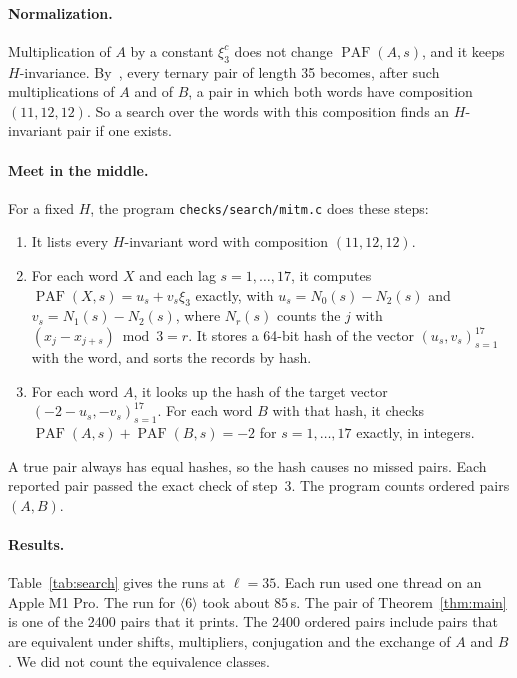 \documentclass[11pt]{article}
\theoremstyle{remark}
\newcommand{\PAF}{\operatorname{PAF}}
\begin{document}
\paragraph{Normalization.} Multiplication of $A$ by a constant $\xi_3^c$ does not change $\PAF(A, s)$, and it keeps $H$-invariance. By~\cite[Theorem~4]{KLW}, every ternary pair of length 35 becomes, after such multiplications of $A$ and of $B$, a pair in which both words have composition $(11, 12, 12)$. So a search over the words with this composition finds an $H$-invariant pair if one exists.

\paragraph{Meet in the middle.} For a fixed $H$, the program \texttt{checks/search/mitm.c} does these steps:
\begin{enumerate}
  \item It lists every $H$-invariant word with composition $(11, 12, 12)$.
  \item For each word $X$ and each lag $s = 1, \dots, 17$, it computes $\PAF(X, s) = u_s + v_s \xi_3$ exactly, with $u_s = N_0(s) - N_2(s)$ and $v_s = N_1(s) - N_2(s)$, where $N_r(s)$ counts the $j$ with $(x_j - x_{j+s}) \bmod 3 = r$. It stores a 64-bit hash of the vector $(u_s, v_s)_{s=1}^{17}$ with the word, and sorts the records by hash.
  \item For each word $A$, it looks up the hash of the target vector $(-2 - u_s, -v_s)_{s=1}^{17}$. For each word $B$ with that hash, it checks $\PAF(A,s) + \PAF(B,s) = -2$ for $s = 1, \dots, 17$ exactly, in integers.
\end{enumerate}
A true pair always has equal hashes, so the hash causes no missed pairs. Each reported pair passed the exact check of step~3. The program counts ordered pairs $(A, B)$.

\paragraph{Results.} Table~\ref{tab:search} gives the runs at $\ell = 35$. Each run used one thread on an Apple M1 Pro. The run for $\langle 6 \rangle$ took about 85\,s. The pair of Theorem~\ref{thm:main} is one of the 2400 pairs that it prints. The 2400 ordered pairs include pairs that are equivalent under shifts, multipliers, conjugation and the exchange of $A$ and $B$. We did not count the equivalence classes.
\end{document}
